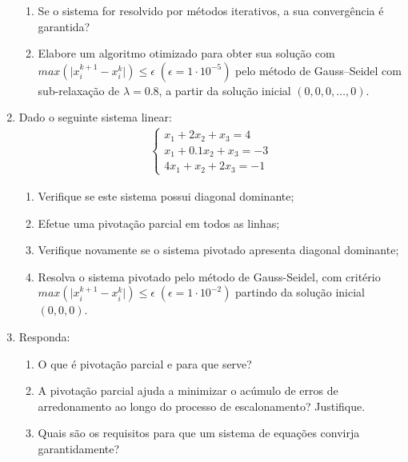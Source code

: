 \documentclass[12pt]{article}
\newenvironment{smallitem}{
    \vspace{-2mm}
    \begin{enumerate}
    \setlength{\parskip}{0pt}
    \setlength{\itemsep}{2pt}
}{
    \vspace{-2mm}
    \end{enumerate}
}
\begin{document}
\begin{enumerate}[label=\textbf{\arabic*})]
\begin{smallitem}
\item Se o sistema for resolvido por métodos iterativos, a sua convergência é
garantida?

\item Elabore um algoritmo otimizado para obter sua solução com $max(\vert
x_i^{k + 1} - x_i^k \vert) \leq \epsilon \; (\epsilon = 1 \cdot 10^{-5})$ pelo
método de Gauss--Seidel com sub-relaxação de $\lambda = 0.8$, a partir da
solução inicial $(0, 0, 0, \dots, 0)$.

\end{smallitem}

\item Dado o seguinte sistema linear:
\begin{align*}
\begin{cases}
x_1 + 2x_2 + x_3 = 4 \\
x_1 + 0.1x_2 + x_3 = -3 \\
4x_1 + x_2 + 2x_3 = -1
\end{cases}
\end{align*}

\begin{smallitem}

\item Verifique se este sistema possui diagonal dominante;

\item Efetue uma pivotação parcial em todos as linhas;

\item Verifique novamente se o sistema pivotado apresenta diagonal dominante;

\item Resolva o sistema pivotado pelo método de Gauss-Seidel, com critério
$max(\vert x_i^{k + 1} - x_i^k \vert) \leq \epsilon \; (\epsilon = 1 \cdot
10^{-2})$ partindo da solução inicial $(0, 0, 0)$.

\end{smallitem}

\item Responda:

\begin{smallitem}

\item O que é pivotação parcial e para que serve?

\item A pivotação parcial ajuda a minimizar o acúmulo de erros de
arredonamento ao longo do processo de escalonamento? Justifique.

\item Quais são os requisitos para que um sistema de equações convirja
garantidamente?


\end{smallitem}
\end{enumerate}
\end{document}
